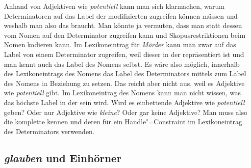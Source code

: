 Anhand von Adjektiven wie \emph{potentiell} kann man sich klarmachen, warum Determinatoren auf das Label der
modifizierten \nbar zugreifen können müssen und weshalb man also das \specm braucht. Man könnte ja
vermuten, dass man statt dessen vom Nomen auf den Determinator zugreifen kann und
Skopusrestriktionen beim Nomen kodieren kann. Im Lexikoneintrag für \emph{Mörder} kann man zwar
auf das Label von einem Determinator zugreifen, weil dieser in der \sprl repräsentiert ist und man
kennt auch das Label des Nomens selbst. Es wäre also möglich, innerhalb des Lexikoneintrags des
Nomens das Label des Determinators mittels \qeq zum Label des Nomens in Beziehung zu setzen. Das
reicht aber nicht aus, weil es Adjektive wie \emph{potentiell} gibt. Im Lexikoneintrag des Nomens
kann man nicht wissen, was das höchste Label in der \nbar sein wird. Wird es einbettende Adjektive
wie \emph{potentiell} geben? Oder nur Adjektive wie \emph{kleine}? Oder gar keine Adjektive? Man
muss also die komplette \nbar kennen und deren \ltopw für ein Handle"=Constraint im Lexikoneintrag
des Determinators verwenden. 

\subsection{\emph{glauben} und Einhörner}


